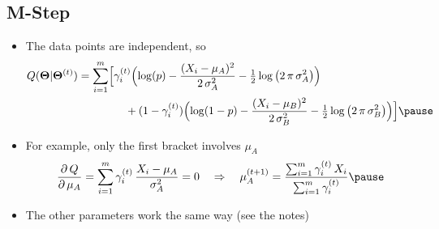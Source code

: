 \begin{slide}
\section[-1]{M-Step}

\begin{PauseHighLight}
  \begin{itemize}
  \item The data points are independent, so
    {\small
      \begin{align*}
       Q(\bm{\Theta}|\bm{\Theta}^{(t)})
      &= \sum_{i=1}^m \Bigl[ \gamma_i^{(t)} \Bigl( \log(p) -
        \frac{(X_i-\mu_A)^2}{2\,\sigma^2_A} - \tfrac12\logg{2\,\pi\,\sigma^2_A}
        \Bigr) \\
      & \hspace{1.5cm} + (1-\gamma_i^{(t)}) \Bigl( \log(1-p) -
        \frac{(X_i-\mu_B)^2}{2\,\sigma^2_B} - \tfrac12\logg{2\,\pi\,\sigma^2_B}
        \Bigr)\Bigr]\pause
    \end{align*} }
  \item For example, only the first bracket involves $\mu_A$
    \begin{align*}
      \pd{Q}{\mu_A} = \sum_{i=1}^m \gamma_i^{(t)}\,
      \frac{X_i-\mu_A}{\sigma_A^2} = 0
      \quad\Rightarrow\quad
      \mu_A^{(t+1)} = \frac{ \sum_{i=1}^m \gamma_i^{(t)}\, X_i}
        {\sum_{i=1}^m \gamma_i^{(t)}}\pause
    \end{align*}
  \item The other parameters work the same way (see the notes)\pause
  \end{itemize}
\end{PauseHighLight}

\end{slide}


